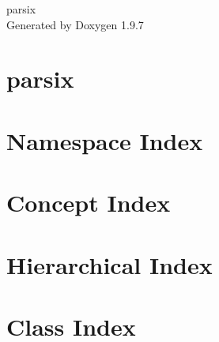 \documentclass[twoside]{book}
\newcommand{\+}{\discretionary{\mbox{\scriptsize$\hookleftarrow$}}{}{}}
\newcommand{\clearemptydoublepage}{%
    \newpage{\pagestyle{empty}\cleardoublepage}%
  }
\begin{document}
  \raggedbottom

  



    \hypersetup{pageanchor=false,
                bookmarksnumbered=true,
                pdfencoding=unicode
               }


  \begin{titlepage}
  \vspace*{7cm}
  \begin{center}%
  {\Large parsix}\\

  \vspace*{1cm}
  {\large Generated by Doxygen 1.9.7}\\

  \end{center}
  \end{titlepage}


  \clearemptydoublepage


  \tableofcontents

  \clearemptydoublepage




  \hypersetup{pageanchor=true}




\chapter{parsix}
\label{md__r_e_a_d_m_e}

\chapter{Namespace Index}

\chapter{Concept Index}

\chapter{Hierarchical Index}

\chapter{Class Index}

\end{document}
